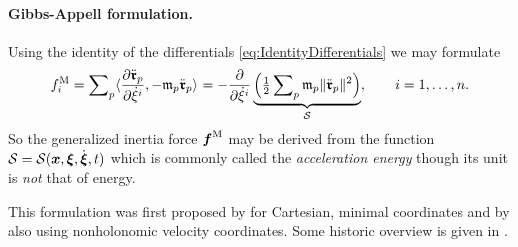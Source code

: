 \paragraph{Gibbs-Appell formulation.}
Using the identity of the differentials \eqref{eq:IdentityDifferentials} we may formulate
\begin{align}
 \genForceInertiaCoeff{\LidxI}
 = \sumParticles \sProd{\pdiff[\particlePosdd{\PidxI}]{\sysVelCoeffd{\LidxI}}}{-\particleMass{\PidxI} \particlePosdd{\PidxI}}
 = -\pdiff{\sysVelCoeffd{\LidxI}} \underbrace{\Big(\tfrac{1}{2} \sumParticles \particleMass{\PidxI} \norm{\particlePosdd{\PidxI}}^2\Big)}_{\accEnergy},
 \qquad
 \LidxI = 1,\ldots,\dimConfigSpace.
\label{eq:InertiaForceAccEnergy}
\end{align}
So the generalized inertia force $\genForceInertia$ may be derived from the function $\accEnergy = \accEnergy(\sysCoord, \sysVel, \sysVeld, t)$ which is commonly called the \textit{acceleration energy} though its unit is \textit{not} that of energy.

This formulation was first proposed by \cite{Gibbs:FundamentalFormulaeOfDynamics} for Cartesian, minimal coordinates and by \cite{Appell:formeGenerale} also using nonholonomic velocity coordinates.
Some historic overview is given in \cite[sec. 1]{Lewis:GaussPrinciple}.

